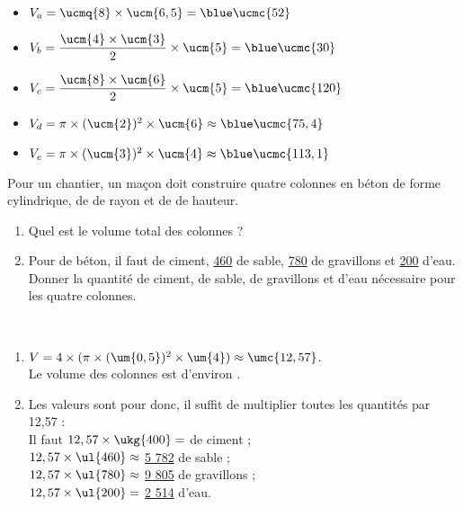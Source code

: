 \begin{colonne*exercice}
\begin{corrige}
   \begin{itemize}
      \item $V_a =\ucmq{8}\times\ucm{6,5} ={\blue \ucmc{52}}$ \smallskip
      \item $V_b =\dfrac{\ucm{4}\times\ucm{3}}{2}\times\ucm{5} ={\blue \ucmc{30}}$ \smallskip
      \item $V_c =\dfrac{\ucm{8}\times\ucm{6}}{2}\times\ucm{5} ={\blue \ucmc{120}}$ \smallskip
      \item $V_d =\pi\times(\ucm{2})^2\times\ucm{6} \approx{\blue \ucmc{75,4}}$ \smallskip
      \item $V_e =\pi\times(\ucm{3})^2\times\ucm{4} \approx{\blue \ucmc{113,1}}$
   \end{itemize}
\end{corrige}

\smallskip


\begin{exercice} %
   Pour un chantier, un maçon doit construire quatre colonnes en béton de forme cylindrique, de  de rayon et de  de hauteur.
   \begin{enumerate}
      \item Quel est le volume total des colonnes ?
      \item Pour  de béton, il faut  de ciment, \ul{460} de sable, \ul{780} de gravillons et \ul{200} d'eau. \\
         Donner la quantité de ciment, de sable, de gravillons et d'eau nécessaire pour les quatre colonnes.
   \end{enumerate}
\end{exercice}

\begin{corrige}
   \ \\ [-5mm]
   \begin{enumerate}
      \item $V =4\times(\pi\times(\um{0,5})^2\times\um{4}) \approx \umc{12,57}$. \\
         {\blue Le volume des colonnes est d'environ }.
      \item Les valeurs sont pour  donc, il suffit de multiplier toutes les quantités par 12,57 : \\
         Il faut $12,57\times\ukg{400} =$ {\blue {} de ciment} ; \\
         $12,57\times\ul{460} \approx$ {\blue \ul{5 782} de sable} ; \\
         $12,57\times\ul{780} \approx$ {\blue \ul{9 805} de gravillons} ; \\
         $12,57\times\ul{200} =$ {\blue \ul{2 514} d'eau}.
   \end{enumerate}
\end{corrige}


\end{colonne*exercice}
